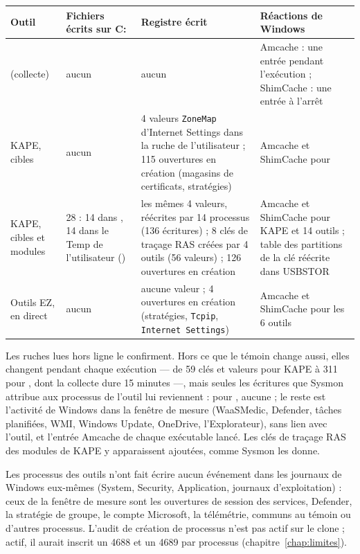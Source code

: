 \documentclass[11pt,a4paper,oneside]{report}
\begin{document}
\begin{longtable}{@{}L{2.5cm}L{3.0cm}L{4.0cm}L{5.5cm}@{}}
\toprule
\textbf{Outil} & \textbf{Fichiers écrits sur C:} & \textbf{Registre écrit} &
  \textbf{Réactions de Windows} \\
\midrule\endhead
\wac{} (collecte) & aucun & aucun & Amcache : une entrée pendant
  l'exécution ; ShimCache : une entrée à l'arrêt \\
KAPE, cibles & aucun & 4 valeurs \texttt{ZoneMap} d'Internet Settings dans la
  ruche de l'utilisateur ; 115 ouvertures en création (magasins de
  certificats, stratégies) & Amcache et ShimCache pour  \\
KAPE, cibles et modules & 28 : 14 dans
  , 14 dans le Temp de l'utilisateur
  () & les mêmes 4 valeurs,
  réécrites par 14 processus (136 écritures) ; 8 clés de traçage RAS créées
  par 4 outils (56 valeurs) ; 126 ouvertures en création & Amcache et
  ShimCache pour KAPE et 14 outils ; table des partitions de la clé
  réécrite dans USBSTOR \\
Outils EZ, en direct & aucun & aucune valeur ; 4 ouvertures en création
  (stratégies, \texttt{Tcpip}, \texttt{Internet Settings}) & Amcache et
  ShimCache pour les 6 outils \\
\bottomrule
\end{longtable}

Les ruches lues hors ligne le confirment. Hors ce que le témoin change aussi,
elles changent pendant chaque exécution --- de 59 clés et valeurs pour KAPE
à 311 pour \wac{}, dont la collecte dure 15 minutes ---, mais seules les
écritures que Sysmon attribue aux processus de l'outil lui reviennent : pour
\wac{}, aucune ; le reste est l'activité de Windows dans la fenêtre de mesure
(WaaSMedic, Defender, tâches planifiées, WMI, Windows Update, OneDrive,
l'Explorateur), sans lien avec l'outil, et l'entrée Amcache de chaque
exécutable lancé. Les clés de traçage RAS des modules de KAPE y apparaissent
ajoutées, comme Sysmon les donne.

Les processus des outils n'ont fait écrire aucun événement dans les journaux
de Windows eux-mêmes (System, Security, Application, journaux d'exploitation) :
ceux de la fenêtre de mesure sont les ouvertures de session des services,
Defender, la stratégie de groupe, le compte Microsoft, la télémétrie, communs
au témoin ou d'autres processus. L'audit de création de processus n'est pas
actif sur le clone ; actif, il aurait inscrit un 4688 et un 4689 par
processus (chapitre~\ref{chap:limites}).
\end{document}
